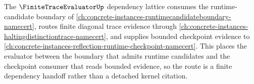 The $\FiniteTraceEvaluatorUp$ dependency lattice consumes the runtime-candidate boundary of \autoref{ch:concrete-instances-runtimecandidateboundary-namecert}, routes finite diagonal trace evidence through \autoref{ch:concrete-instances-haltingdistinctiontrace-namecert}, and supplies bounded checkpoint evidence to \autoref{ch:concrete-instances-reflection-runtime-checkpoint-namecert}. This places the evaluator between the boundary that admits runtime candidates and the checkpoint consumer that reads bounded evidence, so the route is a finite dependency handoff rather than a detached kernel citation.
